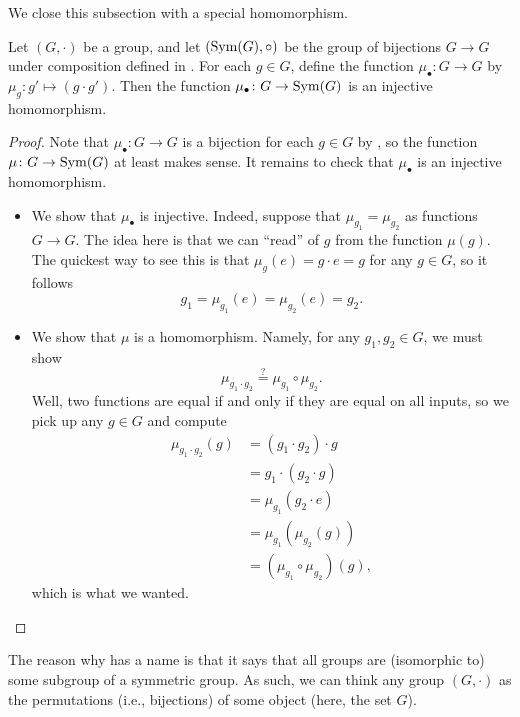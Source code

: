 \documentclass[../notes.tex]{subfiles}
\begin{document}
We close this subsection with a special homomorphism.
\begin{theorem}[Cayley] \label{thm:cayley}
    Let $(G,\cdot)$ be a group, and let $(\operatorname{Sym}(G),\circ)$ be the group of bijections $G\to G$ under composition defined in . For each $g\in G$, define the function $\mu_\bullet\colon G\to G$ by $\mu_g\colon g'\mapsto(g\cdot g')$. Then the function $\mu_\bullet\colon G\to\operatorname{Sym}(G)$ is an injective homomorphism.
\end{theorem}
\begin{proof}
    Note that $\mu_\bullet\colon G\to G$ is a bijection for each $g\in G$ by , so the function $\mu\colon G\to\operatorname{Sym}(G)$ at least makes sense. It remains to check that $\mu_\bullet$ is an injective homomorphism.
    \begin{itemize}
        \item We show that $\mu_\bullet$ is injective. Indeed, suppose that $\mu_{g_1}=\mu_{g_2}$ as functions $G\to G$. The idea here is that we can ``read'' of $g$ from the function $\mu(g)$. The quickest way to see this is that $\mu_g(e)=g\cdot e=g$ for any $g\in G$, so it follows
        \[g_1=\mu_{g_1}(e)=\mu_{g_2}(e)=g_2.\]
        \item We show that $\mu$ is a homomorphism. Namely, for any $g_1,g_2\in G$, we must show
        \[\mu_{g_1\cdot g_2}\stackrel?=\mu_{g_1}\circ\mu_{g_2}.\]
        Well, two functions are equal if and only if they are equal on all inputs, so we pick up any $g\in G$ and compute
        \begin{align*}
            \mu_{g_1\cdot g_2}(g) &= (g_1\cdot g_2)\cdot g \\
            &= g_1\cdot(g_2\cdot g) \\
            &= \mu_{g_1}(g_2\cdot e) \\
            &= \mu_{g_1}(\mu_{g_2}(g)) \\
            &= (\mu_{g_1}\circ\mu_{g_2})(g),
        \end{align*}
        which is what we wanted.
        \qedhere
    \end{itemize}
\end{proof}
\begin{remark}
    The reason why  has a name is that it says that all groups are (isomorphic to) some subgroup of a symmetric group. As such, we can think any group $(G,\cdot)$ as the permutations (i.e., bijections) of some object (here, the set $G$).
\end{remark}
\end{document}
